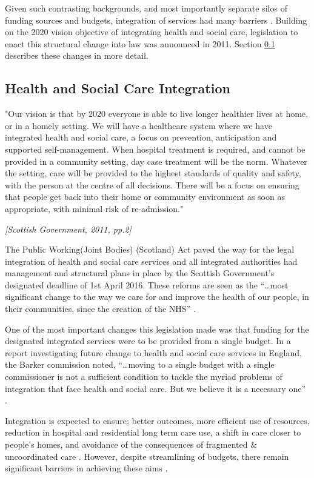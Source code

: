 \documentclass[12pt,]{report}
\begin{document}
Given such contrasting backgrounds, and most importantly separate silos
of funding sources and budgets, integration of services had many
barriers \citep{RN456}. Building on the 2020 vision \citep{RN457}
objective of integrating health and social care, legislation to enact
this structural change into law was announced in 2011. Section
\ref{subsec:hsc-integration} describes these changes in more detail.

\subsection{Health and Social Care Integration}\label{subsec:hsc-integration}

\epigraph{"Our vision is that by 2020 everyone is able to live longer healthier lives at home, or in a homely setting. We will have a healthcare system where we have integrated health and social care, a focus on prevention, anticipation and supported self-management. When hospital treatment is required, and cannot be provided in a community setting, day case treatment will be the norm. Whatever the setting, care will be provided to the highest standards of quality and safety, with the person at the centre of all decisions. There will be a focus on ensuring that people get back into their home or community environment as soon as appropriate, with minimal risk of re-admission."}{\textit{[Scottish Government, 2011, pp.2]}}

The Public Working(Joint Bodies) (Scotland) Act \citep{RN459} paved the
way for the legal integration of health and social care services and all
integrated authorities had management and structural plans in place by
the Scottish Government's designated deadline of 1st April 2016. These
reforms are seen as the ``\ldots{}most significant change to the way we
care for and improve the health of our people, in their communities,
since the creation of the NHS'' \citep{RN461}.

One of the most important changes this legislation made was that funding
for the designated integrated services were to be provided from a single
budget. In a report investigating future change to health and social
care services in England, the Barker commission noted, ``\ldots{}moving
to a single budget with a single commissioner is not a sufficient
condition to tackle the myriad problems of integration that face health
and social care. But we believe it is a necessary one''
\citep[pp.9]{RN460}.

Integration is expected to ensure; better outcomes, more efficient use
of resources, reduction in hospital and residential long term care use,
a shift in care closer to people's homes, and avoidance of the
consequences of fragmented \& uncoordinated care
\citep{RN252, RN251, RN234, RN232, RN455, RN266}. However, despite
streamlining of budgets, there remain significant barriers in achieving
these aims \citep{RN252, RN251}.
\end{document}
